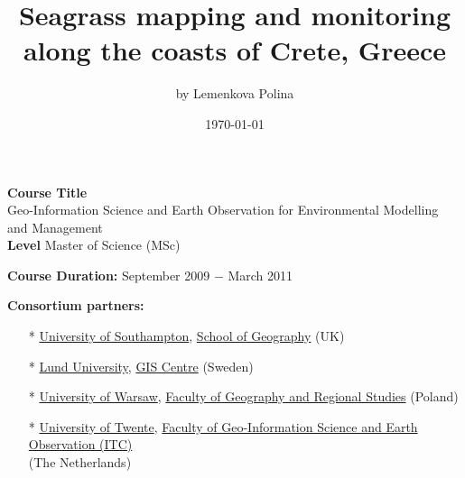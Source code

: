 \documentclass[11pt]{article}
\begin{document}



{}
\begin{titlepage}
	\centering
	\title{Seagrass mapping and monitoring \\ along the coasts of Crete, Greece}
	\author[1]{by Lemenkova Polina}
	\date{\today}
	\maketitle	
\end{titlepage}
\pagebreak

\section*{}
\textbf{Course Title} \\
{Geo-Information Science and Earth Observation for Environmental Modelling and Management}\\

\textbf{Level} \hfill{Master of Science (MSc)}\\

\vspace{1em}

\textbf{Course Duration:} \hfill{September 2009 $-$ March 2011}\\

\vspace{1em}

\textbf{Consortium partners:} \\

\begin{itemize}
	\item[*] \href{http://www.southampton.ac.uk/}{University of Southampton}, \href{http://www.southampton.ac.uk/geography/}{School of Geography} (UK)\\
	\item[*] \href{http://www.lunduniversity.lu.se/}{Lund University}, \href{http://www.giscentrum.lu.se/english/index.htm}{GIS Centre} (Sweden)\\
	\item[*] \href{http://www.uw.edu.pl/en/}{University of Warsaw}, \href{http://www.wgsr.uw.edu.pl/index.php?option=com_content&task=category&sectionid=10&id=32&Itemid=103}{Faculty of Geography and Regional Studies} (Poland)\\
	\item[*] \href{http://www.utwente.nl/en}{University of Twente}, \href{http://www.itc.nl/}{Faculty of Geo-Information Science and Earth Observation (ITC)} \\ (The Netherlands)
\end{itemize}
\end{document}
